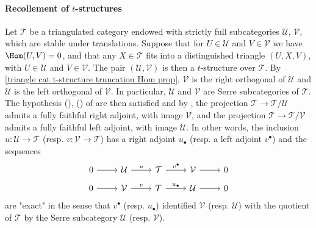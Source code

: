 \paragraph{Recollement of \texorpdfstring{$t$}{t}-structures}\label{triangle cat t-structure recollement paragraph}
Let $\mathcal{T}$ be a triangulated category endowed with strictly full subcategories $\mathcal{U}$, $\mathcal{V}$, which are stable under translations. Suppose that for $U\in\mathcal{U}$ and $V\in\mathcal{V}$ we have $\Hom(U,V)=0$, and that any $X\in\mathcal{T}$ fits into a distinguished triangle $(U,X,V)$, with $U\in\mathcal{U}$ and $V\in\mathcal{V}$. The pair $(\mathcal{U},\mathcal{V})$ is then a $t$-structure over $\mathcal{T}$. By \cref{triangle cat t-structure truncation Hom prop}, $\mathcal{V}$ is the right orthogonal of $\mathcal{U}$ and $\mathcal{U}$ is the left orthogonal of $\mathcal{V}$. In particular, $\mathcal{U}$ and $\mathcal{V}$ are Serre subcategories of $\mathcal{T}$. The hypothesis (), () of \cite[6.4, p.25]{tohoku} are then satisfied and by \cite[6.4, p.23-p.26]{tohoku}, the projection $\mathcal{T}\to\mathcal{T}/\mathcal{U}$ admits a fully faithful right adjoint, with image $\mathcal{V}$, and the projection $\mathcal{T}\to\mathcal{T}/\mathcal{V}$ admits a fully faithful left adjoint, with image $\mathcal{U}$. In other words, the inclusion $u:\mathcal{U}\to\mathcal{T}$ (resp. $v:\mathcal{V}\to\mathcal{T}$) has a right adjoint $u_\bullet$ (resp. a left adjoint $v^\bullet$) and the sequences
\[\begin{tikzcd}
0\ar[r]&\mathcal{U}\ar[r,"u"]&\mathcal{T}\ar[r,"v^\bullet"]&\mathcal{V}\ar[r]&0
\end{tikzcd}\]
\vspace*{-4mm}
\[\begin{tikzcd}
0\ar[r]&\mathcal{V}\ar[r,"v"]&\mathcal{T}\ar[r,"u_\bullet"]&\mathcal{U}\ar[r]&0
\end{tikzcd}\]
are "exact" in the sense that $v^\bullet$ (resp. $u_\bullet$) identified $\mathcal{V}$ (resp. $\mathcal{U}$) with the quotient of $\mathcal{T}$ by the Serre subcategory $\mathcal{U}$ (resp. $\mathcal{V}$).\par


